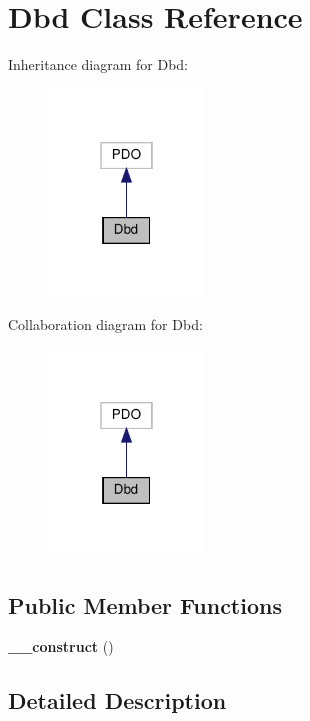 \section{Dbd Class Reference}
\label{class_app_1_1_dbd}


Inheritance diagram for Dbd\+:
\nopagebreak
\begin{figure}[H]
\begin{center}
\leavevmode
\includegraphics[width=118pt]{class_app_1_1_dbd__inherit__graph}
\end{center}
\end{figure}


Collaboration diagram for Dbd\+:
\nopagebreak
\begin{figure}[H]
\begin{center}
\leavevmode
\includegraphics[width=118pt]{class_app_1_1_dbd__coll__graph}
\end{center}
\end{figure}
\subsection*{Public Member Functions}
\begin{DoxyCompactItemize}
\item 
\textbf{ \+\_\+\+\_\+construct} ()
\end{DoxyCompactItemize}


\subsection{Detailed Description}


